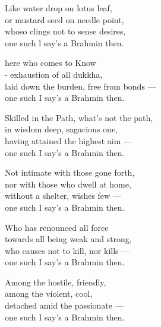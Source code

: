 \begin{MyDescription}{}
Like water drop on lotus leaf,\\
or mustard seed on needle point,\\
whoso clings not to sense desires,\\
one such l say's a Brahmin then.
\end{MyDescription}

\begin{MyDescription}{}
here who comes to Know\\
- exhaustion of all dukkha,\\
laid down the burden, free from bonds —\\
one such I say's a Brahmin then.
\end{MyDescription}

\begin{MyDescription}{}
Skilled in the Path, what's not the path,\\
in wisdom deep, sagacious one,\\
having attained the highest aim —\\
one such I say's a Brahmin then.
\end{MyDescription}

\begin{MyDescription}{}
Not intimate with those gone forth,\\
nor with those who dwell at home,\\
without a shelter, wishes few —\\
one such I say's a Brahmin then.
\end{MyDescription}

\begin{MyDescription}{}
Who has renounced all force\\
towards all being weak and strong,\\
who causes not to kill, nor kills —\\
one such I say's a Brahmin then.
\end{MyDescription}

\begin{MyDescription}{}
Among the hostile, friendly,\\
among the violent, cool,\\
detached amid the passionate —\\
one such I say's a Brahmin then.
\end{MyDescription}

